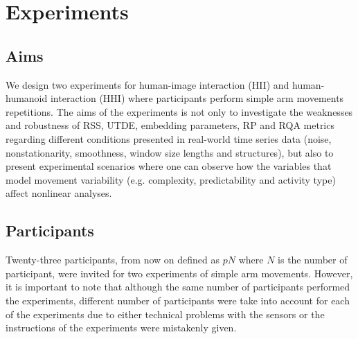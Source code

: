 \chapter{Experiments} \label{chapter4}

%

\graphicspath{{figs/chapter4/PDF/}}




\section{Aims}
We design two experiments for human-image interaction (HII) and 
human-humanoid interaction (HHI) where participants perform simple arm 
movements repetitions.
The aims of the experiments is not only to investigate the weaknesses and 
robustness of RSS, UTDE, embedding parameters, RP and RQA metrics regarding 
different conditions presented in real-world time series data 
(noise, nonstationarity, smoothness, window size lengths and structures), 
but also to present experimental scenarios where one can observe 
how the variables that model movement variability
(e.g. complexity, predictability and activity type)
\citep{stergiou2006, vaillancourt2002, vaillancourt2003}
affect nonlinear analyses.

\section{Participants}
Twenty-three participants, from now on defined as $pN$ where $N$ is the 
number of participant, were invited for two experiments of 
simple arm movements. 
However, it is important to note that although the same number of 
participants performed the experiments, different number of participants 
were take into account for each of the experiments due to either 
technical problems with the sensors or the instructions of the experiments 
were mistakenly given.


